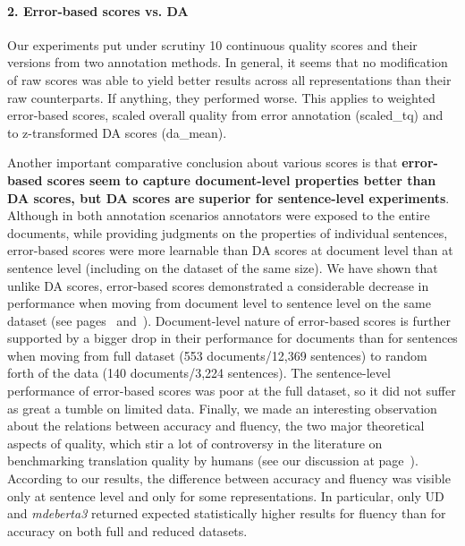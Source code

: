 \paragraph{2. Error-based scores vs. DA}
Our experiments put under scrutiny 10 continuous quality scores and their versions from two annotation methods.
In general, it seems that no modification of raw scores was able to yield better results across all representations than their raw counterparts. If anything, they performed worse. This applies to weighted error-based scores, scaled overall quality from error annotation (scaled\_tq) and to z-transformed DA scores (da\_mean).

Another important comparative conclusion about various scores is that \textbf{error-based scores seem to capture document-level properties better than DA scores, but DA scores are superior for sentence-level experiments}. 
Although in both annotation scenarios annotators were exposed to the entire documents, while providing judgments on the properties of individual sentences, error-based scores were more learnable than DA scores at document level than at sentence level (including on the dataset of the same size). We have shown that unlike DA scores, error-based scores demonstrated a considerable decrease in performance when moving from document level to sentence level on the same dataset (see pages~\pageref{pg:downward_slide} and~\pageref{pg:no_slide_for_da_when_moving_to_sent}). 
Document-level nature of error-based scores is further supported by a bigger drop in their performance for documents than for sentences when moving from full dataset (553 documents/12,369 sentences) to random forth of the data (140 documents/3,224 sentences). The sentence-level performance of error-based scores was poor at the full dataset, so it did not suffer as great a tumble on limited data.
Finally, we made an interesting observation about the relations between accuracy and fluency, the two major theoretical aspects of quality, which stir a lot of controversy in the literature on benchmarking translation quality by humans (see our discussion at page~\pageref{pg:controvercy_over_acc_and_flu}).
According to our results, the difference between accuracy and fluency was visible only at sentence level and only for some representations. In particular, only UD and \textit{mdeberta3} returned expected statistically higher results for fluency than for accuracy on both full and reduced datasets. %
